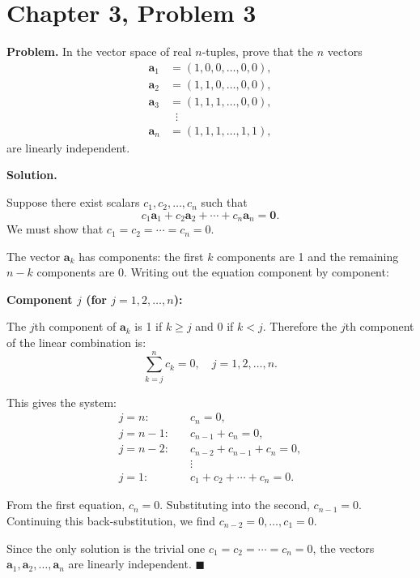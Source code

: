 \documentclass[12pt]{article}
\begin{document}
\section*{Chapter 3, Problem 3}

\textbf{Problem.} In the vector space of real $n$-tuples, prove that the $n$ vectors
\begin{align*}
\mathbf{a}_1 &= (1, 0, 0, \ldots, 0, 0), \\
\mathbf{a}_2 &= (1, 1, 0, \ldots, 0, 0), \\
\mathbf{a}_3 &= (1, 1, 1, \ldots, 0, 0), \\
&\;\;\vdots \\
\mathbf{a}_n &= (1, 1, 1, \ldots, 1, 1),
\end{align*}
are linearly independent.

\bigskip
\textbf{Solution.}

Suppose there exist scalars $c_1, c_2, \ldots, c_n$ such that
\[
c_1 \mathbf{a}_1 + c_2 \mathbf{a}_2 + \cdots + c_n \mathbf{a}_n = \mathbf{0}.
\]
We must show that $c_1 = c_2 = \cdots = c_n = 0$.

The vector $\mathbf{a}_k$ has components: the first $k$ components are 1 and the remaining $n-k$ components are 0. Writing out the equation component by component:

\textbf{Component $j$ (for $j = 1, 2, \ldots, n$):}

The $j$th component of $\mathbf{a}_k$ is 1 if $k \ge j$ and 0 if $k < j$. Therefore the $j$th component of the linear combination is:
\[
\sum_{k=j}^{n} c_k = 0, \quad j = 1, 2, \ldots, n.
\]

This gives the system:
\begin{align*}
j = n: &\quad c_n = 0, \\
j = n-1: &\quad c_{n-1} + c_n = 0, \\
j = n-2: &\quad c_{n-2} + c_{n-1} + c_n = 0, \\
&\quad \vdots \\
j = 1: &\quad c_1 + c_2 + \cdots + c_n = 0.
\end{align*}

From the first equation, $c_n = 0$. Substituting into the second, $c_{n-1} = 0$. Continuing this back-substitution, we find $c_{n-2} = 0, \ldots, c_1 = 0$.

Since the only solution is the trivial one $c_1 = c_2 = \cdots = c_n = 0$, the vectors $\mathbf{a}_1, \mathbf{a}_2, \ldots, \mathbf{a}_n$ are linearly independent. \hfill $\blacksquare$
\end{document}
